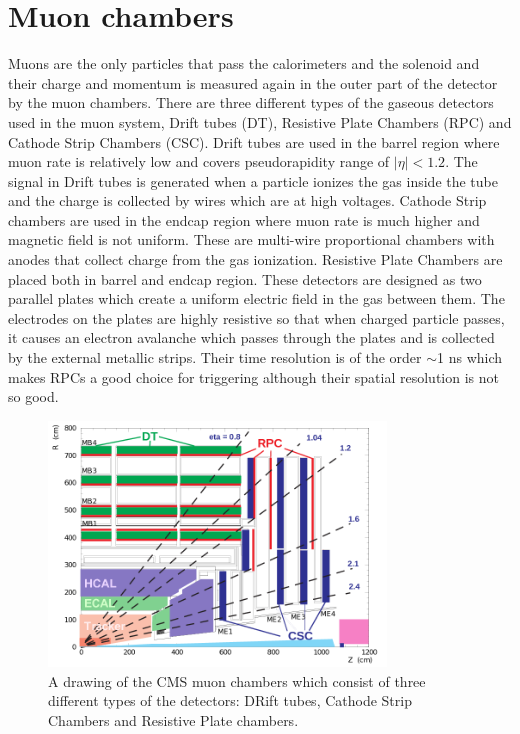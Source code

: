 
\section{Muon chambers}

Muons are the only particles that pass the calorimeters and the solenoid and their charge and momentum is measured again in the outer part of the detector by the muon chambers. There are three different types of the gaseous detectors used in the muon system, Drift tubes (DT), Resistive Plate Chambers (RPC) and Cathode Strip Chambers (CSC). Drift tubes are used in the barrel region where muon rate is relatively low and covers pseudorapidity range of $|\eta|<1.2$. The signal in Drift tubes is generated when a particle ionizes the gas inside the tube and the charge is collected by wires which are at high voltages. Cathode Strip chambers are used in the endcap region where muon rate is much higher and magnetic field is not uniform. These are multi-wire proportional chambers with anodes that collect charge from the gas ionization. Resistive Plate Chambers are placed both in barrel and endcap region. These detectors are designed as two parallel plates which create a uniform electric field in the gas between them. The electrodes on the plates are highly resistive so that when charged particle passes, it causes an electron avalanche which passes through the plates and is collected by the external metallic strips. Their time resolution is of the order $\sim$1 ns which makes RPCs a good choice for triggering although their spatial resolution is not so good.
\begin{figure}[htbp]
	\centering
		\includegraphics[width=0.8\textwidth]{Figures/Muon_chambres.png}
	\caption[CMS Muon Chambers]{A drawing of the CMS muon chambers which consist of three different types of the detectors: DRift tubes, Cathode Strip Chambers and Resistive Plate chambers. \cite{Chatrchyan:2008aa}}
	\label{fig:Mu}
\end{figure} 
 
